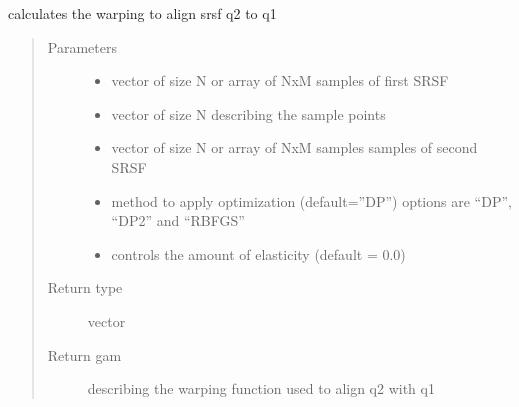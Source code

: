 \documentclass[letterpaper,10pt,english]{sphinxmanual}
\begin{document}
\begin{fulllineitems}
\label{\detokenize{utility_functions:utility_functions.optimum_reparam}}
calculates the warping to align srsf q2 to q1
\begin{quote}\begin{description}
\item[{Parameters}] \leavevmode\begin{itemize}
\item {} 
 \textendash{} vector of size N or array of NxM samples of first SRSF

\item {} 
 \textendash{} vector of size N describing the sample points

\item {} 
 \textendash{} vector of size N or array of NxM samples samples of second SRSF

\item {} 
 \textendash{} method to apply optimization (default=”DP”) options are “DP”, “DP2” and “RBFGS”

\item {} 
 \textendash{} controls the amount of elasticity (default = 0.0)

\end{itemize}

\item[{Return type}] \leavevmode
vector

\item[{Return gam}] \leavevmode
describing the warping function used to align q2 with q1

\end{description}\end{quote}

\end{fulllineitems}

\end{document}
